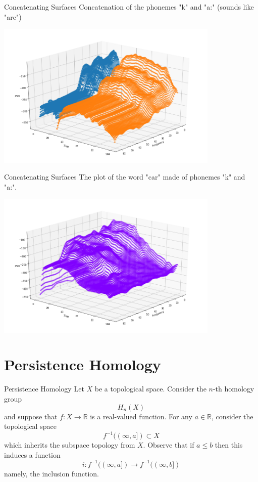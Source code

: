 \documentclass[14pt,aspectratio=169, serif, dvipsnames]{beamer}
\begin{document}
\begin{frame}{Concatenating Surfaces}
Concatenation of the phonemes "k" and "a:" (sounds like "are")
    \begin{center}
        \includegraphics[width = 0.8\textwidth]{pictures/k_ar_plot.png}
    \end{center}
\end{frame}

\begin{frame}{Concatenating Surfaces}
The plot of the word "car" made of phonemes "k" and "a:".
    \begin{center}
        \includegraphics[width = 0.8\textwidth]{pictures/car_test_plot.png}
    \end{center}
\end{frame}
    

\small \section{Persistence Homology}
\begin{frame}{Persistence Homology}
    Let $X$ be a topological space. Consider the $n$-th homology
    group
    \[
        H_n(X)
    \]
    and suppose that $f: X \to \mathbb{R}$ is a real-valued function. For  any $a \in \mathbb{R}$, consider the topological space
    \[
        f^{-1}((\infty,a]) \subset X
    \]
    which inherits the subspace topology from $X$.
    Observe that
    if $a \le b$ then this induces a function 
    \[
        i: f^{-1}((\infty, a]) \to f^{-1}((\infty, b])
    \]
    namely, the inclusion function.
\end{frame}
\end{document}
